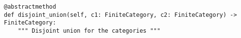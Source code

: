 \begin{verbatim}
@abstractmethod
def disjoint_union(self, c1: FiniteCategory, c2: FiniteCategory) -> FiniteCategory:
    """ Disjoint union for the categories """
\end{verbatim}